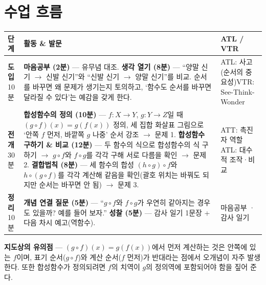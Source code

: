 \documentclass[11pt,a4paper]{article}
\begin{document}
\section{수업 흐름}
\begin{tabularx}{\linewidth}{@{}>{\centering\arraybackslash}p{1.6cm}X>{\raggedright\arraybackslash\small}p{3.1cm}@{}}
\toprule
\textbf{단계} & \textbf{활동 \& 발문} & \textbf{ATL / VTR} \\
\midrule
\textcolor{goldstrong}{\textbf{도입}}\newline\footnotesize 10분 &
\textbf{마음공부 (2분)} --- 유무념 대조.\newline
\textbf{생각 열기 (8분)} --- ``양말 신기 $\to$ 신발 신기''와 ``신발 신기 $\to$ 양말 신기''를 비교. 순서를 바꾸면 왜 문제가 생기는지 토의하고, `함수도 순서를 바꾸면 달라질 수 있다'는 예감을 갖게 한다. &
ATL: 사고(순서의 중요성)\newline VTR: See-Think-Wonder \\
\addlinespace
\textcolor{goldstrong}{\textbf{전개}}\newline\footnotesize 30분 &
\textbf{합성함수의 정의 (10분)} --- $f:X\to Y$, $g:Y\to Z$일 때 $(g\circ f)(x)=g(f(x))$ 정의, 세 집합 화살표 그림으로 `안쪽 $f$ 먼저, 바깥쪽 $g$ 나중' 순서 강조 $\to$ 문제 1.\newline
\textbf{합성함수 구하기 \& 비교 (12분)} --- 두 함수의 식으로 합성함수의 식 구하기 $\to$ $g\circ f$와 $f\circ g$를 각각 구해 서로 다름을 확인 $\to$ 문제 2.\newline
\textbf{결합법칙 (8분)} --- 세 함수의 합성 $(h\circ g)\circ f$와 $h\circ(g\circ f)$를 각각 계산해 같음을 확인(괄호 위치는 바꿔도 되지만 순서는 바꾸면 안 됨) $\to$ 문제 3. &
ATT: 촉진자 역할\newline ATL: 대수적 조작·비교 \\
\addlinespace
\textcolor{goldstrong}{\textbf{정리}}\newline\footnotesize 10분 &
\textbf{개념 연결 질문 (5분)} --- ``$g\circ f$와 $f\circ g$가 우연히 같아지는 경우도 있을까? 예를 들어 보자.''\newline
\textbf{성찰 (5분)} --- 감사 일기 1문장 + 다음 차시 예고(역함수). &
마음공부 · 감사 일기 \\
\bottomrule
\end{tabularx}

\begin{calloutbox}
\textbf{지도상의 유의점} --- $(g\circ f)(x)=g(f(x))$에서 먼저 계산하는 것은 안쪽에 있는 $f$이며, 표기 순서($g\circ f$)와 계산 순서($f$ 먼저)가 반대라는 점에서 오개념이 자주 발생한다. 또한 합성함수가 정의되려면 $f$의 치역이 $g$의 정의역에 포함되어야 함을 짚어 준다.
\end{calloutbox}
\end{document}
